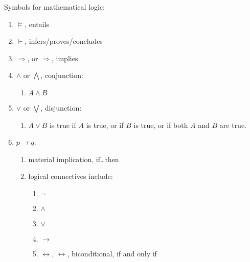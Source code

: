 Symbols for mathematical logic: \vspace{-0.3cm}
\begin{enumerate} \itemsep -4pt
\item $\models$, entails
\item $\vdash$, infers/proves/concludes
\item $\Rightarrow$, or $\Longrightarrow$, implies
\item $\land$ or $\bigwedge$, conjunction: \vspace{-0.3cm}
	\begin{enumerate} \itemsep -2pt
	\item $A\land B$
	\end{enumerate}
\item $\lor$ or $\bigvee$, disjunction: \vspace{-0.3cm}
	\begin{enumerate} \itemsep -2pt
	\item $A\lor B$ is true if ${\displaystyle A}$ is true, or if ${\displaystyle B}$ is true, or if both ${\displaystyle A}$ and ${\displaystyle B}$ are true.
	\end{enumerate}
\item $p \rightarrow q$: \vspace{-0.3cm}
	\begin{enumerate} \itemsep -2pt
	\item material implication, if\dots then
	\item logical connectives include: \vspace{-0.2cm}
		\begin{enumerate} \itemsep -2pt
		\item $\neg$
		\item $\land$
		\item $\lor$
		\item $\rightarrow$
		\item $\leftrightarrow$, $\longleftrightarrow$, biconditional, if and only if
		\end{enumerate}
	\end{enumerate}
\end{enumerate}





